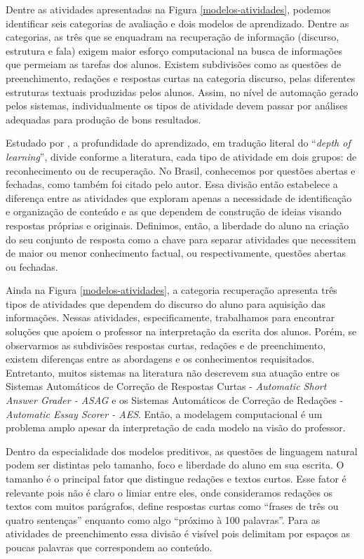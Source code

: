 Dentre as atividades apresentadas na Figura \ref{modelos-atividades}, podemos identificar seis categorias de avaliação e dois modelos de aprendizado. Dentre as categorias, as três que se enquadram na recuperação de informação (discurso, estrutura e fala) exigem maior esforço computacional na busca de informações que permeiam as tarefas dos alunos. Existem subdivisões como as questões de preenchimento, redações e respostas curtas na categoria discurso, pelas diferentes estruturas textuais produzidas pelos alunos. Assim, no nível de automação gerado pelos sistemas, individualmente os tipos de atividade devem passar por análises adequadas para produção de bons resultados.

Estudado por , a profundidade do aprendizado, em tradução literal do ``\textit{depth of learning}'', divide conforme a literatura, cada tipo de atividade em dois grupos: de reconhecimento ou de recuperação. No Brasil, conhecemos por questões abertas e fechadas, como também foi citado pelo autor. Essa divisão então estabelece a diferença entre as atividades que exploram apenas a necessidade de identificação e organização de conteúdo e as que dependem de construção de ideias visando respostas próprias e originais. Definimos, então, a liberdade do aluno na criação do seu conjunto de resposta como a chave para separar atividades que necessitem de maior ou menor conhecimento factual, ou respectivamente, questões abertas ou fechadas.

Ainda na Figura \ref{modelos-atividades}, a categoria recuperação apresenta três tipos de atividades que dependem do discurso do aluno para aquisição das informações. Nessas atividades, especificamente, trabalhamos para encontrar soluções que apoiem o professor na interpretação da escrita dos alunos. Porém, se observarmos as subdivisões respostas curtas, redações e de preenchimento, existem diferenças entre as abordagens e os conhecimentos requisitados. Entretanto, muitos sistemas na literatura não descrevem sua atuação entre os Sistemas Automáticos de Correção de Respostas Curtas - \textit{Automatic Short Answer Grader - ASAG} e os Sistemas Automáticos de Correção de Redações - \textit{Automatic Essay Scorer - AES}. Então, a modelagem computacional é um problema amplo apesar da interpretação de cada modelo na visão do professor. 

Dentro da especialidade dos modelos preditivos, as questões de linguagem natural podem ser distintas pelo tamanho, foco e liberdade do aluno em sua escrita. O tamanho é o principal fator que distingue redações e textos curtos. Esse fator é relevante pois não é claro o limiar entre eles, onde consideramos redações os textos com muitos parágrafos,  define respostas curtas como ``frases de três ou quatro sentenças'' enquanto  como algo ``próximo à 100 palavras''. Para as atividades de preenchimento essa divisão é visível pois delimitam por espaços as poucas palavras que correspondem ao conteúdo. 

